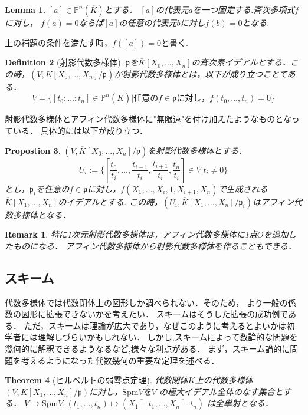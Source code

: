 \documentclass{ujarticle}
\newtheorem{thm}{Theorem}[section]
\newtheorem{dfn}[thm]{Definition}
\newtheorem{prop}[thm]{Propostion}
\newtheorem{lem}[thm]{Lemma}
\newtheorem*{rem}{Remark}
\begin{document}
\begin{lem}
 $[a] \in \mathbb{P}^n(\overline{K})$とする． $[a]$の代表元$a$を一つ固定する.斉次多項式$f$に対し，
 $f(a)=0$ならば$[a]$の任意の代表元$b$に対し$f(b)=0$となる.
\end{lem}

上の補題の条件を満たす時，$f([a])=0$と書く.

\begin{dfn}[射影代数多様体]
  $\mathfrak{p}$を$\overline{K}[X_0,\dots,X_n]$の斉次素イデアルとする．この時，$(V,\overline{K}[X_0,\dots,X_n]/\mathfrak{p})$が射影代数多様体とは，以下が成り立つことである．
  \begin{equation*}
   V=\{[t_0:\dots:t_n] \in \mathbb{P}^n(\overline{K}) |
   \mbox{任意の}f \in \mathfrak{p} \mbox{に対し，}f(t_0, \dots ,t_n)=0\}
  \end{equation*}
\end{dfn}

射影代数多様体とアフィン代数多様体に"無限遠"を付け加えたようなものとなっている．
具体的には以下が成り立つ．

\begin{prop}
$(V,\overline{K}[X_0 ,\dots,X_n]/\mathfrak{p})$を射影代数多様体とする．
\begin{equation*}
  U_i :=\{[\frac{t_0}{t_i},\dots,\frac{t_{i-1}}{t_i},\frac{t_{i+1}}{t_i},\frac{t_n}{t_i}]\in V | t_i \neq 0\}
\end{equation*}
とし，$\mathfrak{p}_i$を任意の$f\in \mathfrak{p}$に対し，$f(X_1,\dots,X_i,1,X_{i+1},X_n)$で生成される$\overline{K}[X_1,\dots,X_n]$のイデアルとする.
この時，$(U_i,\overline{K}[X_1,\dots,X_n]/\mathfrak{p}_i)$はアフィン代数多様体となる．
\end{prop}
\begin{rem}
  特に1次元射影代数多様体は，アフィン代数多様体に1点$O$を追加したものになる．
  アフィン代数多様体から射影代数多様体を作ることもできる．
\end{rem}

\subsection{スキーム}
\label{sub:スキーム}
代数多様体では代数閉体上の図形しか調べられない．そのため，
より一般の係数の図形に拡張できないかを考えたい．
スキームはそうした拡張の成功例である．
ただ，スキームは理論が広大であり，なぜこのように考えるとよいかは初学者には理解しづらいかもしれない．
しかし,スキームによって数論的な問題を幾何的に解釈できるようなるなど,様々な利点がある．
まず，スキーム論的に問題を考えるようになった代数幾何の重要な定理を述べる．
\begin{thm}[ヒルベルトの弱零点定理]
代数閉体$K$上の代数多様体$(V,K[X_1,\dots,X_n]/\mathfrak{p})$に対し，$\mathrm{Spm}V$を$V$
の極大イデアル全体のなす集合とする．
$V \to \mathrm{Spm}V,(t_1,\dots,t_n)\mapsto (\overline{X_1 - t_1},\dots,\overline{X_n - t_n})$
は全単射となる．
\end{thm}
\end{document}
